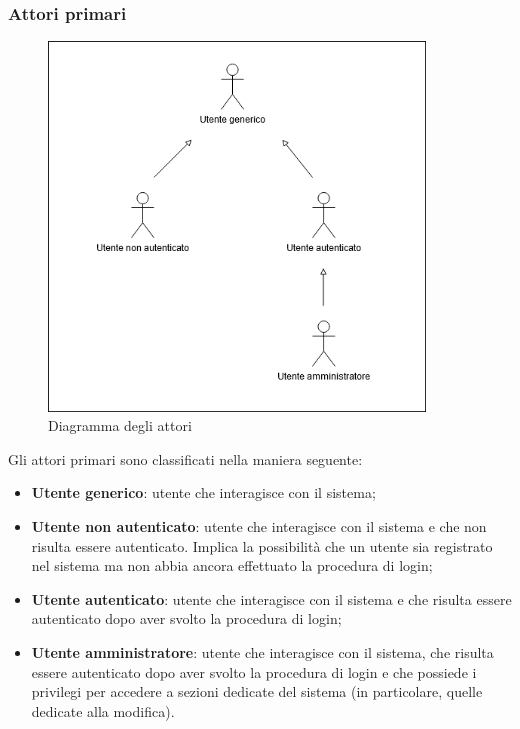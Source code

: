 \subsubsection{Attori primari}
	\begin{figure}[h!]
		\centering
		\includegraphics[width=10cm]{images/diagramma_attori.png}
		\caption{Diagramma degli attori}
	\end{figure}

	Gli attori primari sono classificati nella maniera seguente:
	\begin{itemize}
		\item \textbf{Utente generico}: utente che interagisce con il sistema;
		\item \textbf{Utente non autenticato}: utente che interagisce con il sistema e che non risulta essere autenticato. Implica la possibilità che un utente sia registrato nel sistema ma non abbia ancora effettuato la procedura di login;
		\item \textbf{Utente autenticato}: utente che interagisce con il sistema e che risulta essere autenticato dopo aver svolto la procedura di login;
		\item \textbf{Utente amministratore}: utente che interagisce con il sistema, che risulta essere autenticato dopo aver svolto la procedura di login e che possiede i privilegi per accedere a sezioni dedicate del sistema (in particolare, quelle dedicate alla modifica).
	\end{itemize}